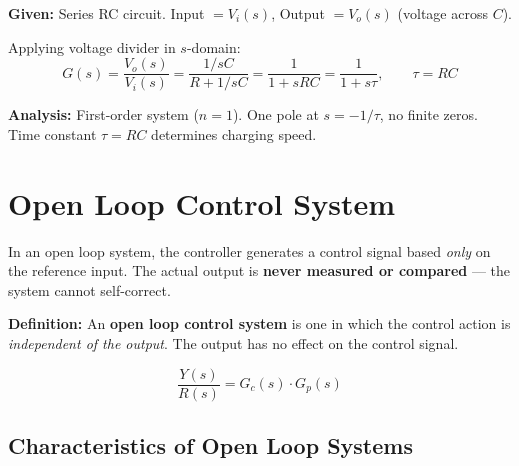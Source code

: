 \documentclass[12pt,a4paper]{article}
\begin{document}
\begin{tcolorbox}[examplebox]
\textbf{Given:} Series RC circuit. Input $= V_i(s)$, Output $= V_o(s)$ (voltage across $C$).

Applying voltage divider in $s$-domain:
$$G(s) = \frac{V_o(s)}{V_i(s)} = \frac{1/sC}{R + 1/sC} = \frac{1}{1 + sRC} = \frac{1}{1 + s\tau}, \qquad \tau = RC$$

\textbf{Analysis:} First-order system ($n=1$). One pole at $s = -1/\tau$, no finite zeros. Time constant $\tau = RC$ determines charging speed.
\end{tcolorbox}

\section{Open Loop Control System}

In an open loop system, the controller generates a control signal based \textit{only} on the reference input. The actual output is \textbf{never measured or compared} — the system cannot self-correct.

\begin{tcolorbox}[defbox]
\textbf{Definition:} An \textbf{open loop control system} is one in which the control action is \textit{independent of the output}. The output has no effect on the control signal.
\end{tcolorbox}

\begin{tcolorbox}[tikzbox, title={Open Loop Block Diagram}]
\centering
{}
\end{tcolorbox}

$$\frac{Y(s)}{R(s)} = G_c(s)\cdot G_p(s)$$

\subsection{Characteristics of Open Loop Systems}
\end{document}
